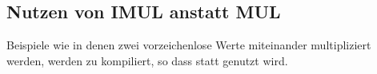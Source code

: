 \subsection{Nutzen von IMUL anstatt MUL}
\label{IMUL_over_MUL}

Beispiele wie  in denen zwei vorzeichenlose Werte miteinander multipliziert
werden, werden zu  kompiliert, so dass \IMUL statt \MUL genutzt wird.

%
%
%
%

